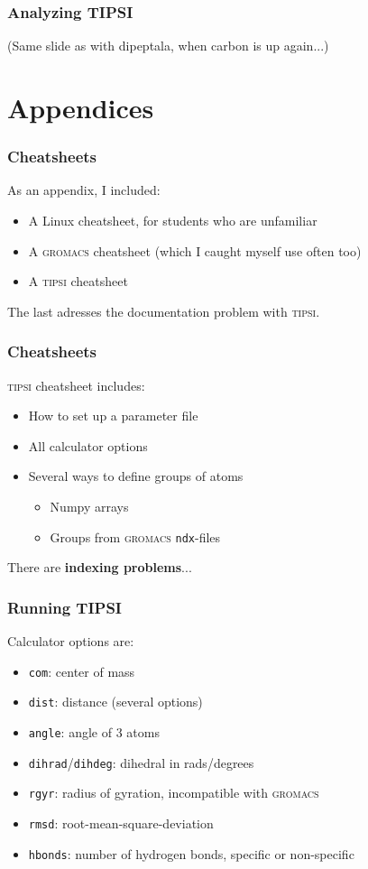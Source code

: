 \documentclass[hyperref={pdfpagelabels=false}]{beamer}
\begin{document}
\begin{frame}
\frametitle{Analyzing \textsc{TIPSI}}

(Same slide as with dipeptala, when carbon is up again...)

\end{frame}

\section{Appendices}
\setcounter{subsection}{1}

\begin{frame}
\frametitle{Cheatsheets}
As an appendix, I included:
\begin{itemize}
\item A Linux cheatsheet, for students who are unfamiliar
\item A \textsc{gromacs} cheatsheet (which I caught myself use often too)
\item A \textsc{tipsi} cheatsheet
\end{itemize}
The last adresses the documentation problem with \textsc{tipsi}.
\end{frame}

\begin{frame}
\frametitle{Cheatsheets}
\textsc{tipsi} cheatsheet includes:
\begin{itemize}
\item How to set up a parameter file
\item All calculator options
\item Several ways to define groups of atoms
\begin{itemize}
\item Numpy arrays
\item Groups from \textsc{gromacs} \texttt{ndx}-files
\end{itemize}
\end{itemize}
There are \textbf{indexing problems}...
\end{frame}

\begin{frame}
\frametitle{Running \textsc{TIPSI}} 
Calculator options are:
\begin{itemize}
\item \texttt{com}: center of mass
\item \texttt{dist}: distance (several options)
\item \texttt{angle}: angle of 3 atoms
\item \texttt{dihrad}/\texttt{dihdeg}: dihedral in rads/degrees
\item \texttt{rgyr}: radius of gyration, incompatible with \textsc{gromacs}
\item \texttt{rmsd}: root-mean-square-deviation
\item \texttt{hbonds}: number of hydrogen bonds, specific or non-specific
\end{itemize}
\end{frame}
\end{document}

